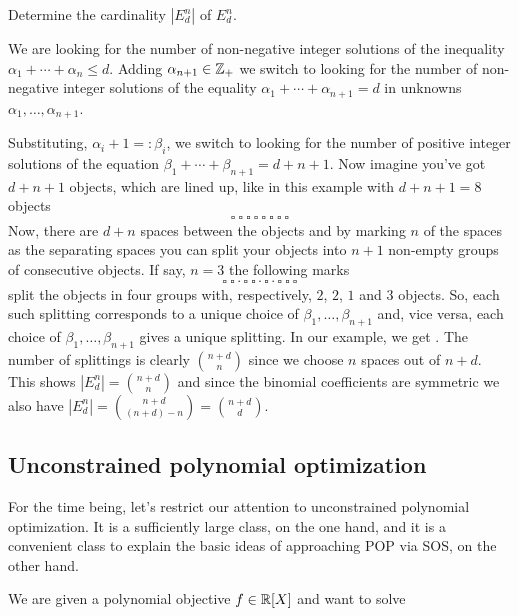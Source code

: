 \begin{exercise}
	Determine the cardinality $|E^n_d|$ of $E^n_d$.
\end{exercise}
\begin{solution}
	We are looking for the number of  non-negative integer solutions of the inequality $\alpha_1 + \cdots + \alpha_n \le d$.  Adding $\alpha_{n+1} \in \mathbb{Z}_+$ we switch to looking for the number of non-negative integer solutions of the equality  $\alpha_1 + \cdots + \alpha_{n+1} = d$ in unknowns $\alpha_1,\ldots,\alpha_{n+1}$. 
		
	Substituting, $\alpha_i + 1 =: \beta_i$, we switch to looking for the number of positive integer solutions of the equation $\beta_1 + \cdots + \beta_{n+1} = d+n+1$. Now imagine you've got $d+n+1$ objects, which are lined up, like in this example with $d+n+1 = 8$ objects
	\[
		\square \ \square \ \square \ \square \ \square \ \square \ \square \  \square 
	\]
	Now, there are $d+n$ spaces between the objects and by marking $n$ of the spaces as the separating spaces you can split your objects into $n+1$ non-empty groups of consecutive objects. If say, $n=3$ the following marks
	\[
	\square \ \square \cdot \square \ \square \cdot \square \cdot \square \ \square \  \square 
	\]
	split the objects in four groups with, respectively, $2$, $2$, $1$ and $3$ objects. So, each such splitting corresponds to a unique choice of $\beta_1,\ldots,\beta_{n+1}$ and, vice versa, each choice of $\beta_1,\ldots,\beta_{n+1}$ gives a unique splitting. In our example, we get . The number of splittings is clearly $\binom{n+d}{n}$ since we choose $n$ spaces out of $n+d$. This shows $|E_d^n| = \binom{n+d}{n}$ and since the binomial coefficients are symmetric we also have $|E_d^n|  = \binom{n+d}{(n+d)-n} = \binom{n+d}{d}$. 
\end{solution}

\subsection{Unconstrained polynomial optimization}

For the time being, let's restrict our attention to unconstrained polynomial optimization. It is a sufficiently large class, on the one hand, and it is a convenient class to explain the basic ideas of approaching POP via SOS, on the other hand. 

We are given a polynomial objective $f \in \mathbb{R}[X]$ and want to solve 

